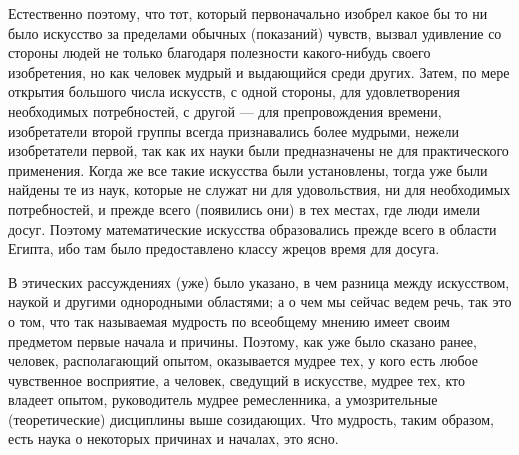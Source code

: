 \documentclass{article}
\begin{document}
Естественно поэтому, что тот, который первоначально изобрел какое бы то ни было искусство за пределами обычных (показаний) чувств, вызвал удивление со стороны людей не только благодаря полезности какого-нибудь своего изобретения, но как человек мудрый и выдающийся среди других. Затем, по мере открытия большого числа искусств, с одной стороны, для удовлетворения необходимых потребностей, с другой — для препровождения времени, изобретатели второй группы всегда признавались более мудрыми, нежели изобретатели первой, так как их науки были предназначены не для практического применения. Когда же все такие искусства были установлены, тогда уже были найдены те из наук, которые не служат ни для удовольствия, ни для необходимых потребностей, и прежде всего (появились они) в тех местах, где люди имели досуг. Поэтому математические искусства образовались прежде всего в области Египта, ибо там было предоставлено классу жрецов время для досуга.

В этических рассуждениях
\footnotemark[7]
(уже) было указано, в чем разница между искусством, наукой и другими однородными областями; а о чем мы сейчас ведем речь, так это о том, что так называемая мудрость по всеобщему мнению имеет своим предметом первые начала и причины. Поэтому, как уже было сказано ранее, человек, располагающий опытом, оказывается мудрее тех, у кого есть любое чувственное восприятие, а человек, сведущий в искусстве, мудрее тех, кто владеет опытом, руководитель мудрее ремесленника, а умозрительные (теоретические) дисциплины выше созидающих. Что мудрость, таким образом, есть наука о некоторых причинах и началах, это ясно.
\end{document}
